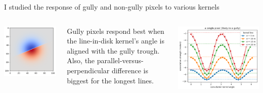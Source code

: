 \documentclass[aspectratio=169]{beamer}
\begin{document}
\begin{frame}{I studied the response of gully and non-gully pixels to various kernels}
\begin{columns}
\begin{minipage}{0.5\linewidth}
\vspace{0.15 cm}
\includegraphics[width=\linewidth]{img/cliff-edge-kernel.png}
\end{minipage}

Gully pixels respond best when the line-in-disk kernel's angle is aligned with the gully trough. Also, the parallel-versus-perpendicular difference is biggest for the longest lines.

\vspace{0.25 cm}
\includegraphics[width=\linewidth]{img/response-to-line-in-disk-convolution.png}
\end{columns}
\end{frame}
\end{document}
